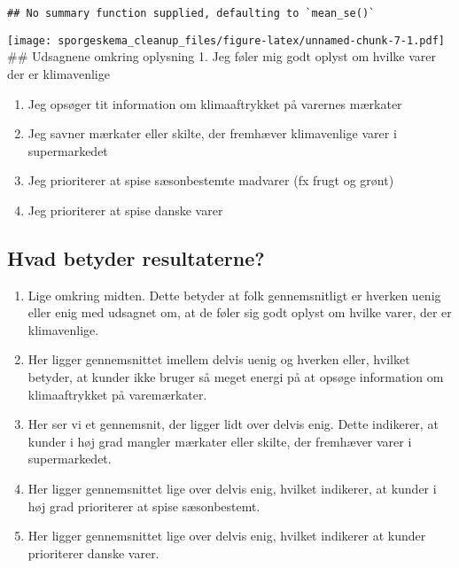 \documentclass[
]{article}
\providecommand{\tightlist}{%
  \setlength{\itemsep}{0pt}\setlength{\parskip}{0pt}}
\begin{document}
\begin{verbatim}
## No summary function supplied, defaulting to `mean_se()`
\end{verbatim}

\texttt{[image: sporgeskema\_cleanup\_files/figure-latex/unnamed-chunk-7-1.pdf]}
\#\# Udsagnene omkring oplysning 1. Jeg føler mig godt oplyst om hvilke
varer der er klimavenlige

\begin{enumerate}
\def\labelenumi{\arabic{enumi}.}
\setcounter{enumi}{1}
\item
  Jeg opsøger tit information om klimaaftrykket på varernes mærkater
\item
  Jeg savner mærkater eller skilte, der fremhæver klimavenlige varer i
  supermarkedet
\item
  Jeg prioriterer at spise sæsonbestemte madvarer (fx frugt og grønt)
\item
  Jeg prioriterer at spise danske varer
\end{enumerate}

\hypertarget{hvad-betyder-resultaterne-1}{%
\subsection{Hvad betyder
resultaterne?}\label{hvad-betyder-resultaterne-1}}

\begin{enumerate}
\def\labelenumi{\arabic{enumi}.}
\tightlist
\item
  Lige omkring midten. Dette betyder at folk gennemsnitligt er hverken
  uenig eller enig med udsagnet om, at de føler sig godt oplyst om
  hvilke varer, der er klimavenlige.
\item
  Her ligger gennemsnittet imellem delvis uenig og hverken eller,
  hvilket betyder, at kunder ikke bruger så meget energi på at opsøge
  information om klimaaftrykket på varemærkater.
\item
  Her ser vi et gennemsnit, der ligger lidt over delvis enig. Dette
  indikerer, at kunder i høj grad mangler mærkater eller skilte, der
  fremhæver varer i supermarkedet.
\item
  Her ligger gennemsnittet lige over delvis enig, hvilket indikerer, at
  kunder i høj grad prioriterer at spise sæsonbestemt.
\item
  Her ligger gennemsnittet lige over delvis enig, hvilket indikerer at
  kunder prioriterer danske varer.
\end{enumerate}
\end{document}
